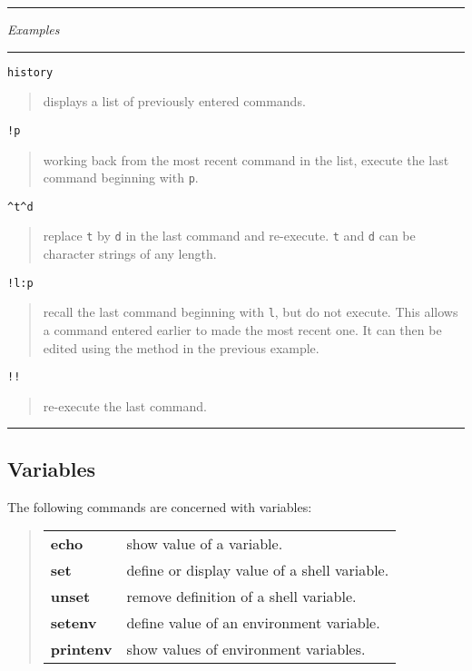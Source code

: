 \documentclass[twoside,11pt]{article}
\newcommand{\example}[2]{\goodbreak
                         {\tt #1}
                         \vspace*{-4mm}
                         \begin{quote}
                           {\small #2}
                         \end{quote}
                        }
\newcommand{\example}[2]{\goodbreak
                            {\tt #1}
                            \vspace*{-4mm}
                            \begin{quote}
                            {#2}
                            \end{quote}
                           }
\newcommand{\exbegin}{\begin{center}
                      \rule{18mm}{0.3mm}
                      {\em Examples}
                      \rule{18mm}{0.3mm}
                      \end{center}
                     }
\newcommand{\exend}{\begin{center}
                    \rule{50mm}{0.3mm}
                    \end{center}
                   }
\begin{document}
\goodbreak

\exbegin

\example{history}
{displays a list of previously entered commands.}

\example{!p}
{working back from the most recent command in the list, execute the last
command beginning with {\tt p}.}

{\tt \verb+^t^d+}
\vspace*{-5mm}
\begin{quote}
{\small   replace {\tt t} by {\tt d} in the last command and re-execute.
  {\tt t} and {\tt d} can be character strings of any length.}
\end{quote}

\example{!l:p}
{recall the last command beginning with {\tt l}, but do not execute.
This allows a command entered earlier to made the most recent one.
It can then be edited using the method in the previous example.}

\example{!!}
{re-execute the last command.}

\exend

\subsection{Variables}

The following commands are concerned with variables:
\begin{quote}
\begin{tabular}{lp{67mm}}

{\bf echo}     & show value of a variable.\\
{\bf set}      & define or display value of a shell variable.\\
{\bf unset}    & remove definition of a shell variable.\\
{\bf setenv}   & define value of an environment variable.\\
{\bf printenv} & show values of environment variables.

\end{tabular}
\end{quote}
\end{document}
